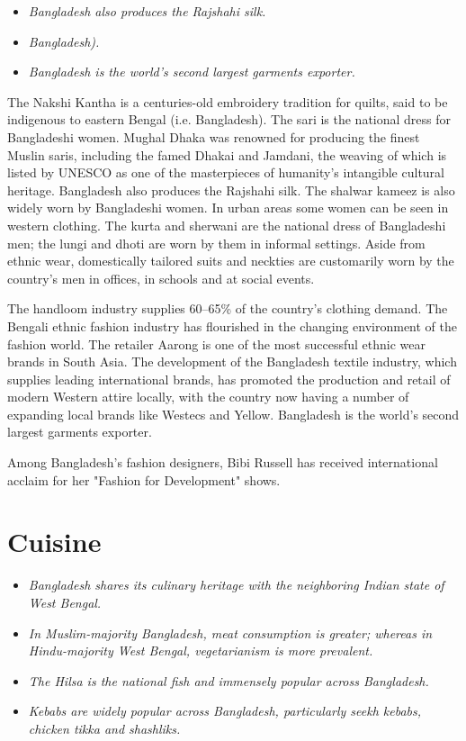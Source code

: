 \begin{itemize}
\item
  \emph{Bangladesh also produces the Rajshahi silk.}
\item
  \emph{Bangladesh).}
\item
  \emph{Bangladesh is the world's second largest garments exporter.}
\end{itemize}

The Nakshi Kantha is a centuries-old embroidery tradition for quilts,
said to be indigenous to eastern Bengal (i.e. Bangladesh). The sari is
the national dress for Bangladeshi women. Mughal Dhaka was renowned for
producing the finest Muslin saris, including the famed Dhakai and
Jamdani, the weaving of which is listed by UNESCO as one of the
masterpieces of humanity's intangible cultural heritage. Bangladesh also
produces the Rajshahi silk. The shalwar kameez is also widely worn by
Bangladeshi women. In urban areas some women can be seen in western
clothing. The kurta and sherwani are the national dress of Bangladeshi
men; the lungi and dhoti are worn by them in informal settings. Aside
from ethnic wear, domestically tailored suits and neckties are
customarily worn by the country's men in offices, in schools and at
social events.

The handloom industry supplies 60--65\% of the country's clothing
demand. The Bengali ethnic fashion industry has flourished in the
changing environment of the fashion world. The retailer Aarong is one of
the most successful ethnic wear brands in South Asia. The development of
the Bangladesh textile industry, which supplies leading international
brands, has promoted the production and retail of modern Western attire
locally, with the country now having a number of expanding local brands
like Westecs and Yellow. Bangladesh is the world's second largest
garments exporter.

Among Bangladesh's fashion designers, Bibi Russell has received
international acclaim for her "Fashion for Development" shows.

\section{Cuisine}\label{cuisine}

\begin{itemize}
\item
  \emph{Bangladesh shares its culinary heritage with the neighboring
  Indian state of West Bengal.}
\item
  \emph{In Muslim-majority Bangladesh, meat consumption is greater;
  whereas in Hindu-majority West Bengal, vegetarianism is more
  prevalent.}
\item
  \emph{The Hilsa is the national fish and immensely popular across
  Bangladesh.}
\item
  \emph{Kebabs are widely popular across Bangladesh, particularly seekh
  kebabs, chicken tikka and shashliks.}
\end{itemize}

